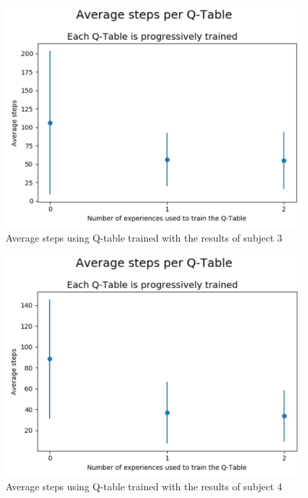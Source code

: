 \documentclass[journal]{IEEEtran}
\begin{document}
\begin{figure}[h]
        \centering
        \includegraphics[scale=0.4]{Images/Average_steps/jose.png} 
        \caption{Average steps using Q-table trained with the results of subject 3}
        \label{fig:avg_steps_3}
\end{figure}

\begin{figure}[h]
        \centering
        \includegraphics[scale=0.4]{Images/Average_steps/juan.png} 
        \caption{Average steps using Q-table trained with the results of subject 4}
        \label{fig:avg_steps_4}
\end{figure}
\end{document}
